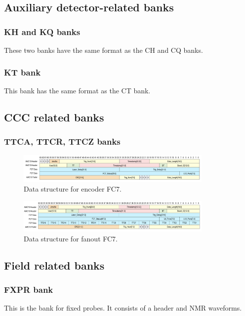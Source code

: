 \subsection{Auxiliary detector-related banks}

\subsubsection*{KH and KQ banks}
These two banks have the same format as the CH and CQ banks.

\subsubsection*{KT bank}
This bank has the same format as the CT bank.

\subsection{CCC related banks}

\subsubsection*{TTCA, TTCR, TTCZ banks}

\begin{figure}[htbp]
\centering
\includegraphics[width=0.85\textwidth]{pics/EncoderFC7.pdf} 
\caption{Data structure for encoder FC7.}\label{fig:EncoderFC7}
\end{figure}

\begin{figure}[htbp]
\centering
\includegraphics[width=0.85\textwidth]{pics/FanoutFC7.pdf} 
\caption{Data structure for fanout FC7.}\label{fig:FanoutFC7}
\end{figure}


\subsection{Field related banks}

\subsubsection*{FXPR bank}
This is the bank for fixed probes. It consists of a header and NMR waveforms.

